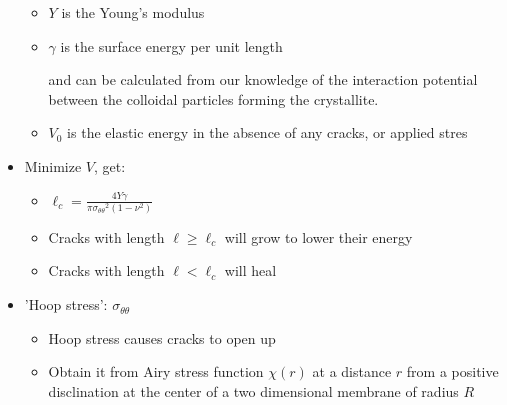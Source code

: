 \documentclass{umthesis}          %
\begin{document}
\begin{itemize}
\begin{itemize}
\item $Y$ is the Young's modulus\\
\label{sec-3.1.5.2.8}


\item $\gamma$ is the surface energy per unit length\\
\label{sec-3.1.5.2.9}

and can be calculated from our knowledge of the interaction potential between the colloidal particles forming the crystallite.

\item $V_0$ is the elastic energy in the absence of any cracks, or applied stres\\
\label{sec-3.1.5.2.10}

\end{itemize} %

\item Minimize $V$, get:\\
\label{sec-3.1.5.3}

\begin{itemize}

\item $\ell_c = \frac{ 4 Y \gamma}{\pi {\sigma_{\theta \theta}}^2 (1-\nu^2)}$\\
\label{sec-3.1.5.3.1}


\item Cracks with length $\ell \ge \ell_c$ will grow to lower their energy\\
\label{sec-3.1.5.3.2}


\item Cracks with length $\ell < \ell_c$ will heal\\
\label{sec-3.1.5.3.3}

\end{itemize} %

\item 'Hoop stress': $\sigma_{\theta \theta}$\\
\label{sec-3.1.5.4}

\begin{itemize}

\item Hoop stress causes cracks to open up\\
\label{sec-3.1.5.4.1}


\item Obtain it from Airy stress function $\chi(r)$  \cite{seung} at a distance $r$ from a positive disclination at the center of a two dimensional membrane of radius $R$\\
\label{sec-3.1.5.4.2}



\end{itemize}
\end{itemize}
\end{document}
